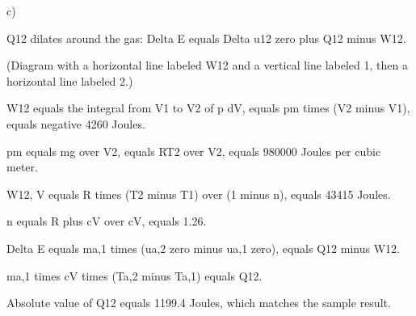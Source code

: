 c)

Q12 dilates around the gas:
Delta E equals Delta u12 zero plus Q12 minus W12.

(Diagram with a horizontal line labeled W12 and a vertical line labeled 1, then a horizontal line labeled 2.)

W12 equals the integral from V1 to V2 of p dV, equals pm times (V2 minus V1), equals negative 4260 Joules.

pm equals mg over V2, equals RT2 over V2, equals 980000 Joules per cubic meter.

W12, V equals R times (T2 minus T1) over (1 minus n), equals 43415 Joules.

n equals R plus cV over cV, equals 1.26.

Delta E equals ma,1 times (ua,2 zero minus ua,1 zero), equals Q12 minus W12.

ma,1 times cV times (Ta,2 minus Ta,1) equals Q12.

Absolute value of Q12 equals 1199.4 Joules, which matches the sample result.